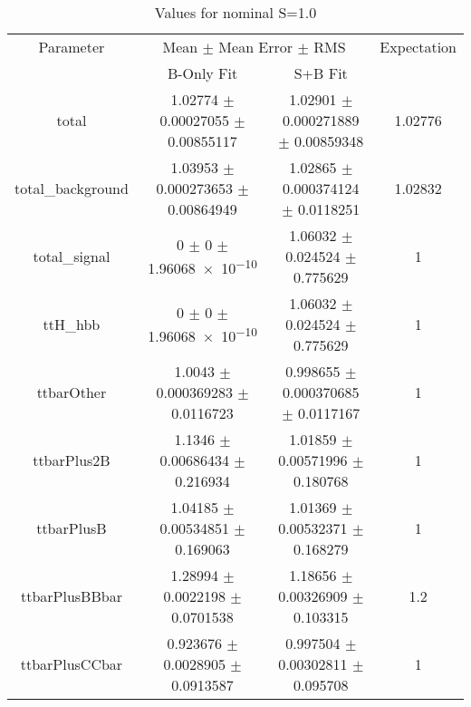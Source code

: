 \begin{table}
\centering
\caption{Values for nominal S=1.0}
\begin{tabular}{cccc}
\toprule
Parameter & \multicolumn{2}{c}{Mean $\pm$ Mean Error $\pm$ RMS} & Expectation\\
 & B-Only Fit & S+B Fit & \\
\midrule
total & \num{1.02774} $\pm$ \num{0.00027055} $\pm$ \num{0.00855117} & \num{1.02901} $\pm$ \num{0.000271889} $\pm$ \num{0.00859348} & \num{1.02776}\\
total\_background & \num{1.03953} $\pm$ \num{0.000273653} $\pm$ \num{0.00864949} & \num{1.02865} $\pm$ \num{0.000374124} $\pm$ \num{0.0118251} & \num{1.02832}\\
total\_signal & \num{0} $\pm$ \num{0} $\pm$ \num{1.96068e-10} & \num{1.06032} $\pm$ \num{0.024524} $\pm$ \num{0.775629} & \num{1}\\
ttH\_hbb & \num{0} $\pm$ \num{0} $\pm$ \num{1.96068e-10} & \num{1.06032} $\pm$ \num{0.024524} $\pm$ \num{0.775629} & \num{1}\\
ttbarOther & \num{1.0043} $\pm$ \num{0.000369283} $\pm$ \num{0.0116723} & \num{0.998655} $\pm$ \num{0.000370685} $\pm$ \num{0.0117167} & \num{1}\\
ttbarPlus2B & \num{1.1346} $\pm$ \num{0.00686434} $\pm$ \num{0.216934} & \num{1.01859} $\pm$ \num{0.00571996} $\pm$ \num{0.180768} & \num{1}\\
ttbarPlusB & \num{1.04185} $\pm$ \num{0.00534851} $\pm$ \num{0.169063} & \num{1.01369} $\pm$ \num{0.00532371} $\pm$ \num{0.168279} & \num{1}\\
ttbarPlusBBbar & \num{1.28994} $\pm$ \num{0.0022198} $\pm$ \num{0.0701538} & \num{1.18656} $\pm$ \num{0.00326909} $\pm$ \num{0.103315} & \num{1.2}\\
ttbarPlusCCbar & \num{0.923676} $\pm$ \num{0.0028905} $\pm$ \num{0.0913587} & \num{0.997504} $\pm$ \num{0.00302811} $\pm$ \num{0.095708} & \num{1}\\
\bottomrule
\end{tabular}
\end{table}